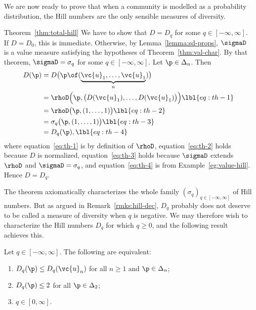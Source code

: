 We are now ready to prove that when a community is modelled as a
probability distribution, the Hill numbers are the only sensible measures
of diversity.

\begin{pfof}{Theorem~\ref{thm:total-hill}}
We have to show that $D = D_q$ for some $q \in [-\infty, \infty]$.  If $D =
D_0$, this is immediate.  Otherwise, by Lemma~\ref{lemma:sd-props},
$\sigmaD$ is a value measure satisfying the hypotheses of
Theorem~\ref{thm:val-char}.  By that theorem, $\sigmaD = \sigma_q$
for some $q \in [-\infty, \infty]$.  Let $\p \in \Delta_n$.  Then
% 
\begin{align}
D(\p)   &
=
D\bigl(\p \of (\underbrace{\vc{u}_1, \ldots, \vc{u}_1}_n) \bigr)
\nonumber       \\
&
=
\rhoD\Bigl( \p, 
\bigl( D(\vc{u}_1), \ldots, D(\vc{u}_1) \bigr)
\Bigr)  
\lbl{eq:th-1} \\
&
=
\rhoD\bigl( \p, (1, \ldots, 1) \bigr)
\lbl{eq:th-2} \\
&
=
\sigma_q\bigl( \p, (1, \ldots, 1) \bigr)
\lbl{eq:th-3} \\
&
=
D_q(\p),
\lbl{eq:th-4}
\end{align}
% 
where equation~\eqref{eq:th-1} is by definition of $\rhoD$,
equation~\eqref{eq:th-2} holds because $D$ is normalized,
equation~\eqref{eq:th-3} holds because $\sigmaD$ extends $\rhoD$ and
$\sigmaD = \sigma_q$, and equation~\eqref{eq:th-4} is from
Example~\ref{eg:value-hill}.  Hence $D = D_q$.
\end{pfof}

The theorem axiomatically characterizes the whole family $(\sigma_q)_{q \in
  [-\infty, \infty]}$ of Hill numbers.  But as argued in
Remark~\ref{rmks:hill-dec}, $D_q$ probably does not
deserve to be called a measure of diversity when $q$ is negative.%
%
%
% 
We may therefore wish to characterize the Hill numbers $D_q$ for which $q
\geq 0$, and the following result achieves this.

\begin{lemma}
Let $q \in [-\infty, \infty]$.  The following are equivalent:
% 
\begin{enumerate}
\item 
{}
$D_q(\p) \leq D_q(\vc{u}_n)$ for all $n \geq 1$ and $\p \in \Delta_n$;

\item
{}
$D_q(\p) \leq 2$ for all $\p \in \Delta_2$;

\item
{}
$q \in [0, \infty]$.
\end{enumerate}
\end{lemma}


